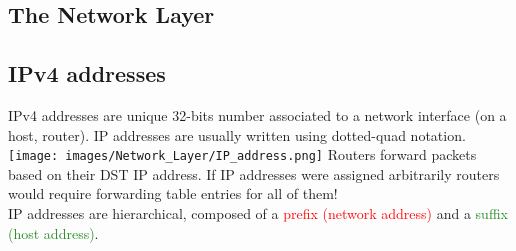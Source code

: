 \documentclass[a4paper, fontsize=8pt, landscape, DIV=1]{scrartcl}
\begin{document}
\begin{multicols*}{4}
		\section{The Network Layer}
		\subsection{IPv4 addresses}
		IPv4 addresses are unique 32-bits number associated to a network interface
		(on a host, router). IP addresses are usually written using dotted-quad
		notation. 
		\texttt{[image: images/Network\_Layer/IP\_address.png]}
		Routers forward packets based on their DST IP address. If IP addresses were
		assigned arbitrarily routers would require forwarding table entries for all of
		them!\\
		IP addresses are hierarchical, composed of a\textcolor{Red}{ prefix
			(network address)} and a \textcolor{ForestGreen}{suffix (host address)}. 
		

\end{multicols*}
\end{document}

